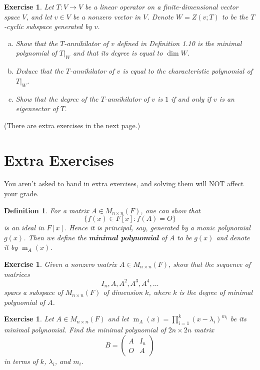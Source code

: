 \documentclass[a4paper]{article}
\theoremstyle{mystyle}
\newtheorem*{definition}{Definition}
\newtheorem{exercise}[theorem]{Exercise}
\newcommand{\6}{\partial}
\DeclareMathOperator{\m}{m}
\begin{document}
\begin{exercise} 
    Let $T:V\to V$ be a linear operator on a finite-dimensional vector space $V$, and let $v\in V$ be a nonzero vector in $V$. Denote $W=Z(v;T)$ to be the $T$-cyclic subspace generated by $v$. 
    \begin{enumerate}[(a)]
        \item Show that the $T$-annihilator of $v$ defined in Definition 1.10 is the minimal polynomial of $T|_W$ and that its degree is equal to $\dim W$.
        \item Deduce that the $T$-annihilator of $v$ is equal to the characteristic polynomial of $T|_W$.
        \item Show that the degree of the $T$-annihilator of $v$ is $1$ if and only if $v$ is an eigenvector of $T$.
    \end{enumerate}
\end{exercise}

\begin{center}
    (There are extra exercises in the next page.)
\end{center}
\newpage

\section*{Extra Exercises}
You aren't asked to hand in extra exercises, and solving them will NOT affect your grade.

\begin{definition}
    For a matrix $A\in M_{n\times n}(F)$, one can show that
    \[
    \{ f(x) \in F[x] : f(A) = O \}
    \]
    is an ideal in $F[x]$. Hence it is principal, say, generated by a monic polynomial $g(x)$. Then we define the \textbf{minimal polynomial} of $A$ to be $g(x)$ and denote it by $\m_A(x)$.
\end{definition}
\begin{exercise}
    Given a nonzero matrix $A\in M_{n\times n}(F)$, show that the sequence of matrices
    \[
    I_n, A, A^2, A^3, A^4, \dots
    \]
    spans a subspace of $M_{n\times n}(F)$ of dimension $k$, where $k$ is the degree of minimal polynomial of $A$. 
\end{exercise}

\begin{exercise}
    Let $A\in M_{n\times n}(F)$ and let $\displaystyle \m_A(x)=\prod_{i=1}^k (x-\lambda_i)^{m_i}$ be its minimal polynomial. Find the minimal polynomial of $2n\times 2n$ matrix
    \[
    B=
    \begin{pmatrix}
        A & I_n \\
        O & A
    \end{pmatrix}
    \]
    in terms of $k$, $\lambda_i$, and $m_i$.
\end{exercise}
\end{document}
